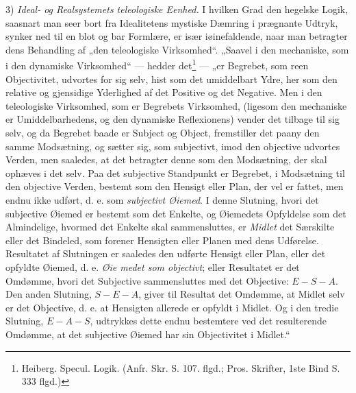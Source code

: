 \documentclass[11pt]{book}
\newcommand{\opage}[1]{\marginnote{\footnotesize\textit{[#1]}}}
\begin{document}
3) \emph{Ideal- og Realsystemets teleologiske Eenhed.} I hvilken Grad
den hegelske Logik, saasnart man seer bort fra Idealitetens mystiske
Dæmring i prægnante Udtryk, synker ned til en blot og bar Formlære, er
især iøinefaldende, naar man betragter dens Behandling af „den
teleologiske Virksomhed“. „Saavel i den mechaniske, som i den dynamiske
Virksomhed“ --- hedder det\footnote{Heiberg. Specul. Logik. (Anfr. Skr.
S. 107. flgd.; Pros. Skrifter, 1ste Bind S. 333 flgd.)} --- „er
Begrebet, som reen Objectivitet, udvortes for sig selv, hist som det
umiddelbart Ydre, her som den relative og gjensidige Yderlighed af det
Positive og det Negative. Men i den teleologiske Virksomhed, som er
Begrebets Virksomhed, (ligesom den mechaniske er Umiddelbarhedens, og den
dynamiske Reflexionens) vender det tilbage til sig selv, og da Begrebet
baade er Subject og Object, fremstiller det paany den samme Modsætning,
og sætter sig, som subjectivt, imod den objective udvortes Verden,
\opage{225} \setcounter{footnote}{0}%
men saaledes, at det betragter denne som den Modsætning, der skal
ophæves i det selv. Paa det subjective Standpunkt er Begrebet, i
Modsætning til den objective Verden, bestemt som den Hensigt eller Plan,
der vel er fattet, men endnu ikke udført, d. e. som \emph{subjectivt
Øiemed}. I denne Slutning, hvori det subjective Øiemed er bestemt som det
Enkelte, og Øiemedets Opfyldelse som det Almindelige, hvormed det Enkelte
skal sammensluttes, er \emph{Midlet} det Særskilte eller det Bindeled,
som forener Hensigten eller Planen med dens Udførelse. Resultatet af
Slutningen er saaledes den udførte Hensigt eller Plan, eller det opfyldte
Øiemed, d. e. \emph{Øie\-%
medet som objectivt}; eller Resultatet er det Omdømme, hvori det
Subjective sammensluttes med det Objective: $E - S - A$. Den anden
Slutning, $S - E - A$, giver til Resultat det Omdømme, at Midlet selv er
det Objective, d. e. at Hensigten allerede er opfyldt i Midlet. Og i den
tredie Slutning, $E - A - S$, udtrykkes dette endnu bestemtere ved det
resulterende Omdømme, at det subjective Øiemed har sin Objectivitet i
Midlet.“
\end{document}
